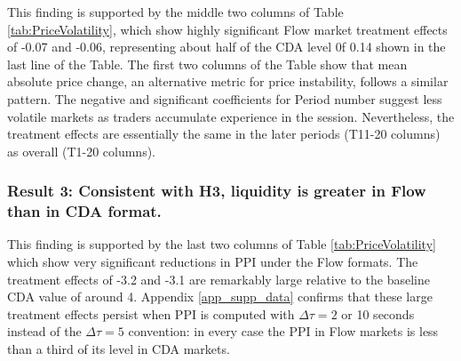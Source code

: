 \documentclass[12pt]{article}
\begin{document}
This finding is supported by the middle two columns of Table \ref{tab:PriceVolatility}, which show highly significant Flow market treatment effects
of -0.07 and -0.06, representing about half of the CDA level 0f 0.14 shown in the last line of the Table. The first two columns of the Table show that mean absolute price change, an alternative metric for price instability, follows a similar pattern.  
The negative and significant coefficients for Period number suggest less volatile markets as traders accumulate experience in the session. 
Nevertheless, the treatment effects are essentially the same in the later periods (T11-20 columns) as overall (T1-20 columns).

\subsubsection*{Result 3: Consistent with H3, liquidity is greater in Flow than in  CDA format.}

This finding is supported by the last two columns of Table \ref{tab:PriceVolatility} which show very significant reductions in PPI under the Flow formats. The treatment effects of -3.2 and -3.1 are remarkably large relative to the baseline CDA value of around 4. 
Appendix \ref{app_supp_data} confirms that 
these large treatment effects persist when PPI 
is computed with $\Delta \tau = 2$ or 10 seconds instead of the $\Delta \tau = 5$ convention: in every case
the PPI in Flow markets is less than a third of its level in CDA markets.
\end{document}
